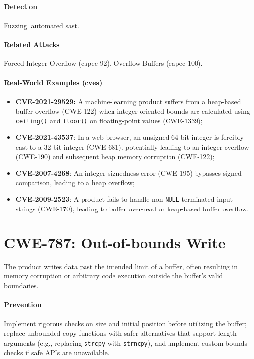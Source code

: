 \paragraph{Detection} Fuzzing, automated \gls{sast}.

\paragraph{Related Attacks} Forced Integer Overflow (\gls{capec}-92), Overflow Buffers (\gls{capec}-100).

\paragraph{Real-World Examples (\glspl{cve})}
\begin{itemize}
    \item \textbf{CVE-2021-29529:} A machine-learning product suffers from a heap-based buffer overflow (CWE-122) when integer-oriented bounds are calculated using \texttt{ceiling()} and \texttt{floor()} on floating-point values (CWE-1339);
    \item \textbf{CVE-2021-43537}: In a web browser, an unsigned 64-bit integer is forcibly cast to a 32-bit integer (CWE-681), potentially leading to an integer overflow (CWE-190) and subsequent heap memory corruption (CWE-122);
    \item \textbf{CVE-2007-4268}: An integer signedness error (CWE-195) bypasses signed comparison, leading to a heap overflow;
    \item \textbf{CVE-2009-2523}: A product fails to handle non-\texttt{NULL}-terminated input strings (CWE-170), leading to buffer over-read or heap-based buffer overflow.
\end{itemize}

\section{CWE-787: Out-of-bounds Write}
The product writes data past the intended limit of a buffer, often resulting in memory corruption or arbitrary code execution outside the buffer's valid boundaries.

\paragraph{Prevention} Implement rigorous checks on size and initial position before utilizing the buffer; replace unbounded copy functions with safer alternatives that support length arguments (e.g., replacing \texttt{strcpy} with \texttt{strncpy}), and implement custom bounds checks if safe APIs are unavailable.

